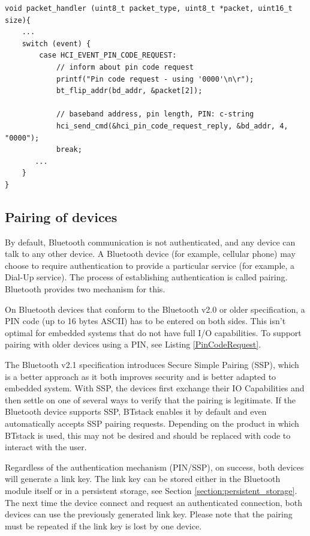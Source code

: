 \documentclass[a4paper,titlepage,oneside,12pt]{amsart} %
\begin{document}
\begin{lstlisting}[caption=Answering authentication request with PIN 0000., label=PinCodeRequest]
void packet_handler (uint8_t packet_type, uint8_t *packet, uint16_t size){
    ...
    switch (event) {
        case HCI_EVENT_PIN_CODE_REQUEST:
            // inform about pin code request
            printf("Pin code request - using '0000'\n\r");
            bt_flip_addr(bd_addr, &packet[2]);
            
            // baseband address, pin length, PIN: c-string
            hci_send_cmd(&hci_pin_code_request_reply, &bd_addr, 4, "0000");
            break;
       ...
    }
}
\end{lstlisting}
\subsection{Pairing of devices}
By default, Bluetooth communication is not authenticated, and any device can talk to any other device. A Bluetooth device (for example, cellular phone) may choose to require authentication to provide a particular service (for example, a Dial-Up service). The process of establishing authentication is called pairing. Bluetooth provides two mechanism for this.

On Bluetooth devices that conform to the Bluetooth v2.0 or older specification, a PIN code (up to 16 bytes ASCII) has to be entered on both sides. This isn't optimal for embedded systems that do not have full I/O capabilities. To support pairing with older devices using a PIN, see Listing \ref{PinCodeRequest}.

The Bluetooth v2.1 specification introduces Secure Simple Pairing (SSP), which is a better approach as it both improves security and is better adapted to embedded system. With SSP, the devices first exchange their IO Capabilities and then settle on one of several ways to verify that the pairing is legitimate. If the Bluetooth device supports SSP, BTstack enables it by default and even automatically accepts SSP pairing requests. Depending on the product in which BTstack is used, this may not be desired and should be replaced with code to interact with the user.

Regardless of the authentication mechanism (PIN/SSP), on success, both devices will generate a link key. The link key can be stored either in the Bluetooth module itself or in a persistent storage, see Section \ref{section:persistent_storage}. The next time the device connect and request an authenticated connection, both devices can use the previously generated link key. Please note that the pairing must be repeated if the link key is lost by one device.
\end{document}
